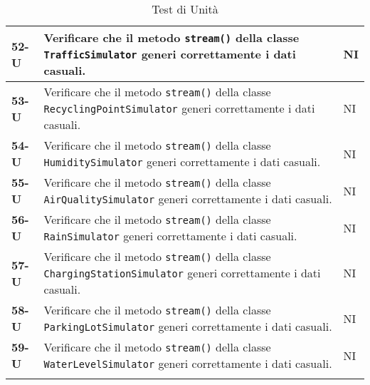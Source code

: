 \begin{longtable}{|>{\raggedright\arraybackslash}m{}|>{\raggedright\arraybackslash}m{}|>{\raggedright\arraybackslash}m{}|}
	\hline
	\textbf{52-U}   & Verificare che il metodo \texttt{stream()} della classe \texttt{TrafficSimulator} generi correttamente i dati casuali.                                            & NI             \\
	\hline
	\textbf{53-U}   & Verificare che il metodo \texttt{stream()} della classe \texttt{RecyclingPointSimulator} generi correttamente i dati casuali.                                     & NI             \\
	\hline
	\textbf{54-U}   & Verificare che il metodo \texttt{stream()} della classe \texttt{HumiditySimulator} generi correttamente i dati casuali.                                           & NI             \\
	\hline
	\textbf{55-U}   & Verificare che il metodo \texttt{stream()} della classe \texttt{AirQualitySimulator} generi correttamente i dati casuali.                                         & NI             \\
	\hline
	\textbf{56-U}   & Verificare che il metodo \texttt{stream()} della classe \texttt{RainSimulator} generi correttamente i dati casuali.                                               & NI             \\
	\hline
	\textbf{57-U}   & Verificare che il metodo \texttt{stream()} della classe \texttt{ChargingStationSimulator} generi correttamente i dati casuali.                                    & NI             \\
	\hline
	\textbf{58-U}   & Verificare che il metodo \texttt{stream()} della classe \texttt{ParkingLotSimulator} generi correttamente i dati casuali.                                         & NI             \\
	\hline
	\textbf{59-U}   & Verificare che il metodo \texttt{stream()} della classe \texttt{WaterLevelSimulator} generi correttamente i dati casuali.                                         & NI             \\
	\hline
	\caption{Test di Unità}
\end{longtable}

